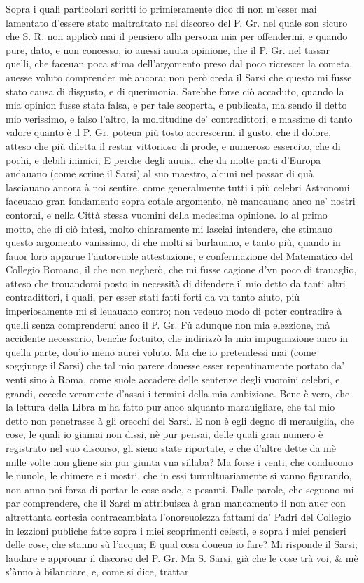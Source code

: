 \documentclass[11pt,twoside,openany]{book}
\begin{document}
Sopra i quali particolari scritti io primieramente dico di non m'esser mai lamentato d'essere stato maltrattato nel discorso del P. Gr. nel quale son sicuro che S. R. non applicò mai il pensiero alla persona mia per offendermi, e quando pure, dato, e non concesso, io auessi auuta opinione, che il P. Gr. nel tassar quelli, che faceuan poca stima dell'argomento preso dal poco ricrescer la cometa, auesse voluto comprender mè ancora: non però creda il Sarsi che questo mi fusse stato causa di disgusto, e di querimonia. Sarebbe forse ciò accaduto, quando la mia opinion fusse stata falsa, e per tale scoperta, e publicata, ma sendo il detto mio verissimo, e falso l'altro, la moltitudine de' contradittori, e massime di tanto valore quanto è il P. Gr. poteua più tosto accrescermi il gusto, che il dolore, atteso che più diletta il restar vittorioso di prode, e numeroso essercito, che di pochi, e debili inimici; E perche degli auuisi, che da molte parti d'Europa andauano (come scriue il Sarsi) al suo maestro, alcuni nel passar di quà lasciauano ancora à noi sentire, come generalmente tutti i più celebri Astronomi faceuano gran fondamento sopra cotale argomento, nè mancauano anco ne' nostri contorni, e nella Città stessa vuomini della medesima opinione. Io al primo motto, che di ciò intesi, molto chiaramente mi lasciai intendere, che stimauo questo argomento vanissimo, di che molti si burlauano, e tanto più, quando in fauor loro apparue l'autoreuole attestazione, e confermazione del Matematico del Collegio Romano, il che non negherò, che mi fusse cagione d'vn poco di trauaglio, atteso che trouandomi posto in necessità di difendere il mio detto da tanti altri contradittori, i quali, per esser stati fatti forti da vn tanto aiuto, più imperiosamente mi si leuauano contro; non vedeuo modo di poter contradire à quelli senza comprenderui anco il P. Gr. Fù adunque non mia elezzione, mà accidente necessario, benche fortuito, che indirizzò la mia impugnazione anco in quella parte, dou'io meno aurei voluto. Ma che io pretendessi mai (come soggiunge il Sarsi) che tal mio parere douesse esser repentinamente portato da' venti sino à Roma, come suole accadere delle sentenze degli vuomini celebri, e grandi, eccede veramente d'assai i termini della mia ambizione. Bene è vero, che la lettura della Libra m'ha fatto pur anco alquanto marauigliare, che tal mio detto non penetrasse à gli orecchi del Sarsi. E non è egli degno di merauiglia, che cose, le quali io giamai non dissi, nè pur pensai, delle quali gran numero è registrato nel suo discorso, gli sieno state riportate, e che d'altre dette da mè mille volte non gliene sia pur giunta vna sillaba? Ma forse i venti, che conducono le nuuole, le chimere e i mostri, che in essi tumultuariamente si vanno figurando, non anno poi forza di portar le cose sode, e pesanti. Dalle parole, che seguono mi par comprendere, che il Sarsi m'attribuisca à gran mancamento il non auer con altrettanta cortesia contracambiata l'onoreuolezza fattami da' Padri del Collegio in lezzioni publiche fatte sopra i miei scoprimenti celesti, e sopra i miei pensieri delle cose, che stanno sù l'acqua; E qual cosa doueua io fare? Mi risponde il Sarsi; laudare e approuar il discorso del P. Gr. Ma S. Sarsi, già che le cose trà voi, \& mè s'ànno à bilanciare, e, come si dice, trattar 
\end{document}
